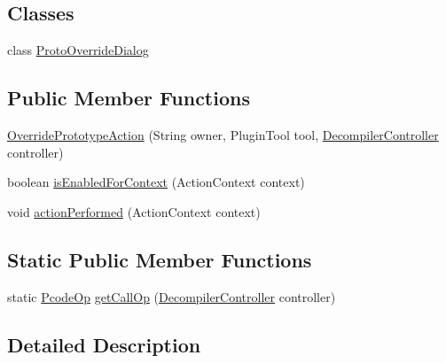 \subsection*{Classes}
\begin{DoxyCompactItemize}
\item 
class \mbox{\hyperlink{classghidra_1_1app_1_1plugin_1_1core_1_1decompile_1_1actions_1_1_override_prototype_action_1_1_proto_override_dialog}{Proto\+Override\+Dialog}}
\end{DoxyCompactItemize}
\subsection*{Public Member Functions}
\begin{DoxyCompactItemize}
\item 
\mbox{\hyperlink{classghidra_1_1app_1_1plugin_1_1core_1_1decompile_1_1actions_1_1_override_prototype_action_ae193265358379679e664b813521fba13}{Override\+Prototype\+Action}} (String owner, Plugin\+Tool tool, \mbox{\hyperlink{classghidra_1_1app_1_1decompiler_1_1component_1_1_decompiler_controller}{Decompiler\+Controller}} controller)
\item 
boolean \mbox{\hyperlink{classghidra_1_1app_1_1plugin_1_1core_1_1decompile_1_1actions_1_1_override_prototype_action_aa035bd212f83d2cb35253ef232fa18bb}{is\+Enabled\+For\+Context}} (Action\+Context context)
\item 
void \mbox{\hyperlink{classghidra_1_1app_1_1plugin_1_1core_1_1decompile_1_1actions_1_1_override_prototype_action_af15dd916345bcdfb7c16df2dae48654f}{action\+Performed}} (Action\+Context context)
\end{DoxyCompactItemize}
\subsection*{Static Public Member Functions}
\begin{DoxyCompactItemize}
\item 
static \mbox{\hyperlink{class_pcode_op}{Pcode\+Op}} \mbox{\hyperlink{classghidra_1_1app_1_1plugin_1_1core_1_1decompile_1_1actions_1_1_override_prototype_action_aea2f7158a2f70a1c091ae54cd8bc85d7}{get\+Call\+Op}} (\mbox{\hyperlink{classghidra_1_1app_1_1decompiler_1_1component_1_1_decompiler_controller}{Decompiler\+Controller}} controller)
\end{DoxyCompactItemize}


\subsection{Detailed Description}


